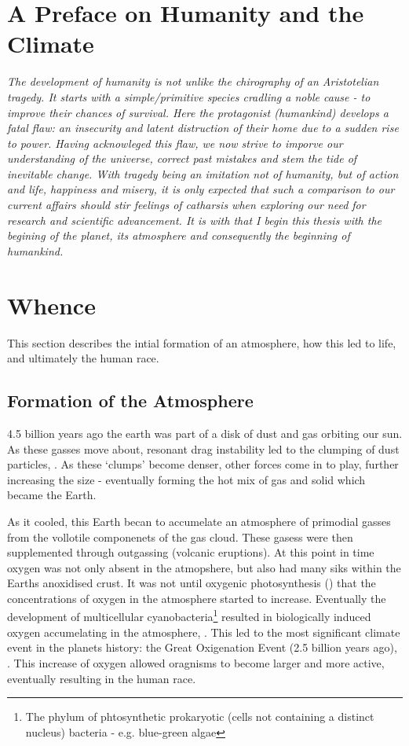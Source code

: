
\section*{A Preface on Humanity and the Climate}
\begin{flushleft}\emph{
The development of humanity is not unlike the chirography of an Aristotelian tragedy. It starts with a simple/primitive species cradling a noble cause - to improve their chances of survival. Here the protagonist (humankind) develops a fatal flaw: an insecurity and latent distruction of their home due to a sudden rise to power. 
Having acknowleged this flaw, we now strive to imporve our understanding of the universe, correct past mistakes and stem the tide of inevitable change. \vspace{\baselineskip}\linebreak
With tragedy being an imitation not of humanity, but of action and life, happiness and misery, it is only expected that such a comparison to our current affairs should stir feelings of catharsis when exploring our need for research and scientific advancement. 
It is with that I begin this thesis with the begining of the planet, its atmosphere and consequently the beginning of humankind. 
}
\end{flushleft}

\section{Whence} 
This section describes the intial formation of an atmosphere, how this led to life, and ultimately the human race. 
\subsection{Formation of the Atmosphere}
 4.5 billion years ago the earth was part of a disk of dust and gas orbiting our sun. As these gasses move about, resonant drag instability led to the clumping of dust particles, \cite{drag,planet}. As these `clumps' become denser, other forces come in to play, further increasing the size - eventually forming the hot mix of gas and solid which became the Earth. 

As it cooled, this Earth becan to accumelate an atmosphere of primodial gasses from the vollotile componenets of the gas cloud. These gasess were then supplemented through outgassing (volcanic eruptions). At this point in time oxygen was not only absent in the atmopshere, but also had many siks within the Earths anoxidised crust. It was not until oxygenic photosynthesis (\cite{oxygenicphotosynthesis}) that the concentrations of oxygen in the atmosphere started to increase. Eventually the development of multicellular cyanobacteria\footnote{The phylum of phtosynthetic prokaryotic (cells not containing a distinct nucleus) bacteria - e.g. blue-green algae} resulted in biologically induced oxygen accumelating in the atmosphere, \cite{multicellular}. This led to the most significant climate event in the planets history: the Great Oxigenation Event (2.5 billion years ago), \cite{oxidation}. This increase of oxygen allowed oragnisms to become larger and more active, eventually resulting in the human race. 

